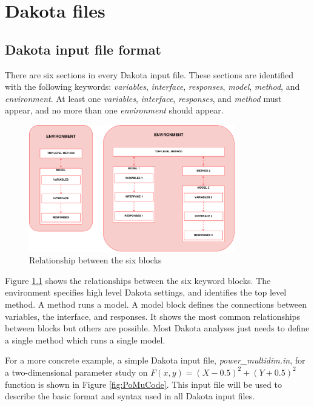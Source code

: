 \documentclass[12pt,a4paper,article]{memoir}
\begin{document}
\chapter{Dakota files}

\section{Dakota input file format}

There are six sections in every Dakota input file. These sections are identified with the following keywords: \textit{variables}, \textit{interface}, \textit{responses}, \textit{model}, \textit{method}, and \textit{environment}. At least one \textit{variables}, \textit{interface}, \textit{responses}, and \textit{method} must appear, and no more than one \textit{environment} should appear.

\begin{figure}[htb!]
  \centering
    \includegraphics[width=0.8\textwidth]{DakotaInputFile}
  \caption{Relationship between the six blocks}
  \label{fig:InputFile}
\end{figure}

Figure \ref{fig:InputFile} shows the relationships between the six keyword blocks. The environment specifies high level Dakota settings, and identifies the top level method. A method runs a model. A model block defines the connections between variables, the interface, and responses. It shows the most common relationships between blocks but others are possible. Most Dakota analyses just needs to define a single method which runs a single model.

For a more concrete example, a simple Dakota input file, \textit{power\_multidim.in}, for a two-dimensional parameter study on $F(x,y)=(X-0.5)^2+(Y+0.5)^2$ function is shown in Figure \ref{fig:PoMuCode}. This input file will be used to describe the basic format and syntax used in all Dakota input files.
\end{document}
